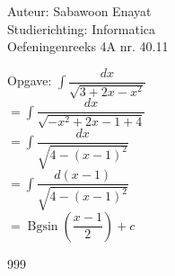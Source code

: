 \documentclass[a4paper]{article}
\begin{document}
  
\noindent \large Auteur: Sabawoon Enayat \\
\noindent \large Studierichting: Informatica\\
\noindent \large Oefeningenreeks 4A nr. 40.11 \\

\newcommand{\dint}{\displaystyle\int}
\newcommand{\Bgsin}{\operatorname{Bgsin}}

\medskip

\normalsize

Opgave: $\dint \dfrac{dx}{\sqrt{3 + 2x - x^2}}$\\

$= \dint \dfrac{dx}{\sqrt{-x^2 + 2x - 1 + 4}}$\\

$= \dint \dfrac{dx}{\sqrt{4 - (x - 1)^2}}$\\

$= \dint \dfrac{d(x - 1)}{\sqrt{4 - (x - 1)^2}}$\\

$= \Bgsin \left(\dfrac{x - 1}{2}\right) + c$\\

\begin{thebibliography}{999}
\end{thebibliography}
\end{document}
